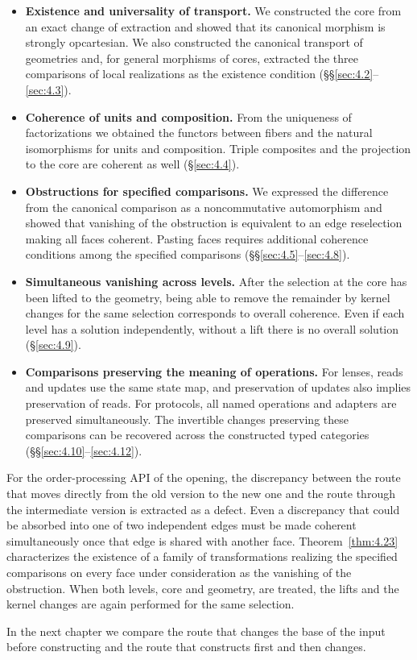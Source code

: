 \begin{itemize}
\item \textbf{Existence and universality of transport.} We constructed the core from an
exact change of extraction and showed that its canonical morphism is strongly
opcartesian.
We also constructed the canonical transport of geometries and, for general morphisms of
cores, extracted the three comparisons of local realizations as the existence condition
(\S\S\ref{sec:4.2}--\ref{sec:4.3}).
\item \textbf{Coherence of units and composition.} From the uniqueness of factorizations
we obtained the functors between fibers and the natural isomorphisms for units and
composition. Triple composites and the projection to the core
are coherent as well (\S\ref{sec:4.4}).
\item \textbf{Obstructions for specified comparisons.} We expressed the difference from
the canonical comparison as a noncommutative automorphism and showed that vanishing of the obstruction is equivalent to an edge
reselection making all faces coherent.
Pasting faces requires additional coherence conditions among the specified comparisons
(\S\S\ref{sec:4.5}--\ref{sec:4.8}).
\item \textbf{Simultaneous vanishing across levels.} After the selection at the core has
been lifted to the geometry, being able to remove the remainder by kernel changes for the
same selection corresponds to overall coherence.
Even if each level has a solution independently, without a lift there is no overall
solution (\S\ref{sec:4.9}).
\item \textbf{Comparisons preserving the meaning of operations.} For lenses,
reads and updates use the same state map, and preservation of updates also implies
preservation of reads. For protocols, all named operations and adapters are preserved
simultaneously. The invertible changes preserving these comparisons can be recovered
across the constructed typed categories (\S\S\ref{sec:4.10}--\ref{sec:4.12}).
\end{itemize}

For the order-processing API of the opening, the discrepancy between the route that moves
directly from the old version to the new one and the route through the intermediate
version is extracted as a defect.
Even a discrepancy that could be absorbed into one of two independent edges must be made
coherent simultaneously once that edge is shared with another face.
Theorem~\ref{thm:4.23} characterizes the existence of a family of transformations
realizing the specified comparisons on every face under consideration as the vanishing
of the obstruction.
When both levels, core and geometry, are treated, the lifts and the kernel changes are
again performed for the same selection.

In the next chapter we compare the route that changes the base of the input before
constructing and the route that constructs first and then changes.
